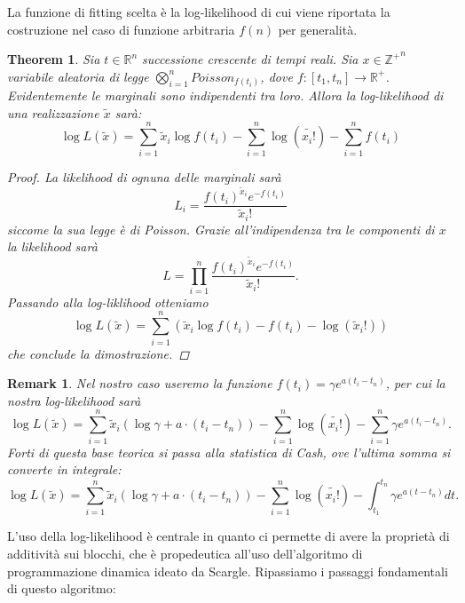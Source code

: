 \documentclass[10pt,a4paper]{report}
\newtheorem{theorem}{Theorem}
\newtheorem{remark}{Remark}
\begin{document}
La funzione di fitting scelta è la log-likelihood di cui viene riportata la costruzione nel caso di funzione arbitraria $f(n)$ per generalità.
\begin{theorem}
Sia $t\in\mathbb{R}^n$ successione crescente di tempi reali.
Sia $x\in\mathbb{Z^+}^n$ variabile aleatoria di legge $\bigotimes_{i=1}^{n}Poisson_{f(t_i)}$, dove $f:[t_1,t_n]\rightarrow\mathbb{R}^+$. Evidentemente le marginali sono indipendenti tra loro. Allora la log-likelihood di una realizzazione $\tilde{x}$ sarà:
$$
\log L(\tilde{x}) = \sum_{i=1}^n\tilde{x}_i\log f(t_i) -\sum_{i=1}^n \log(\tilde{x_i!})-\sum_{i=1}^nf(t_i)
$$
\begin{proof}
La likelihood di ognuna delle marginali sarà 
$$
L_i = \frac{f(t_i)^{\tilde{x}_i}e^{-f(t_i)}}{\tilde{x}_i!}
$$
siccome la sua legge è di Poisson. Grazie all'indipendenza tra le componenti di $x$ la likelihood sarà
$$
L = \prod_{i=1}^{n}\frac{f(t_i)^{\tilde{x}_i}e^{-f(t_i)}}{\tilde{x}_i!}.
$$
Passando alla log-liklihood otteniamo
$$
\log L(\tilde{x}) = \sum_{i=1}^{n}\left(\tilde{x}_i\log f(t_i)-f(t_i) -\log(\tilde{x}_i!)\right)
$$
che conclude la dimostrazione.
\end{proof}
\end{theorem}
\begin{remark}
Nel nostro caso useremo la funzione $f(t_i) = \gamma e^{a(t_i-t_n)}$, per cui la nostra log-likelihood sarà
\begin{equation*}
\log L(\tilde{x}) = \sum_{i=1}^n\tilde{x}_i(\log\gamma + a\cdot(t_i-t_n)) -\sum_{i=1}^n \log(\tilde{x_i!})-\sum_{i=1}^n\gamma e^{a(t_i-t_n)}.
\end{equation*}
Forti di questa base teorica si passa alla statistica di Cash, ove l'ultima somma si converte in integrale:
\begin{equation}
\log L(\tilde{x}) = \sum_{i=1}^n\tilde{x}_i(\log\gamma + a\cdot(t_i-t_n)) -\sum_{i=1}^n \log(\tilde{x_i!})-\int_{t_1}^{t_n}\gamma e^{a(t-t_n)} dt.
\end{equation}
\end{remark}
L'uso della log-likelihood è centrale in quanto ci permette di avere la proprietà di additività sui blocchi, che è propedeutica all'uso dell'algoritmo di programmazione dinamica ideato da Scargle. Ripassiamo i passaggi fondamentali di questo algoritmo:
\end{document}

